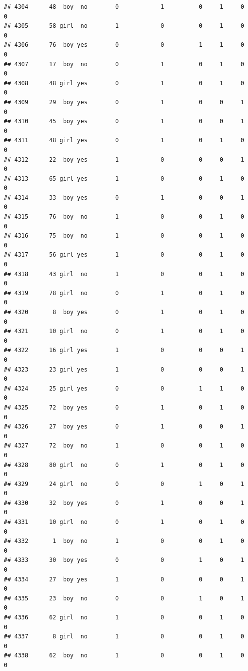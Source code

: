 \documentclass[man]{apa6}
\begin{document}
\begin{verbatim}
## 4304      48  boy  no        0            1          0     1     0     0
## 4305      58 girl  no        1            0          0     1     0     0
## 4306      76  boy yes        0            0          1     1     0     0
## 4307      17  boy  no        0            1          0     1     0     0
## 4308      48 girl yes        0            1          0     1     0     0
## 4309      29  boy yes        0            1          0     0     1     0
## 4310      45  boy yes        0            1          0     0     1     0
## 4311      48 girl yes        0            1          0     1     0     0
## 4312      22  boy yes        1            0          0     0     1     0
## 4313      65 girl yes        1            0          0     1     0     0
## 4314      33  boy yes        0            1          0     0     1     0
## 4315      76  boy  no        1            0          0     1     0     0
## 4316      75  boy  no        1            0          0     1     0     0
## 4317      56 girl yes        1            0          0     1     0     0
## 4318      43 girl  no        1            0          0     1     0     0
## 4319      78 girl  no        0            1          0     1     0     0
## 4320       8  boy yes        0            1          0     1     0     0
## 4321      10 girl  no        0            1          0     1     0     0
## 4322      16 girl yes        1            0          0     0     1     0
## 4323      23 girl yes        1            0          0     0     1     0
## 4324      25 girl yes        0            0          1     1     0     0
## 4325      72  boy yes        0            1          0     1     0     0
## 4326      27  boy yes        0            1          0     0     1     0
## 4327      72  boy  no        1            0          0     1     0     0
## 4328      80 girl  no        0            1          0     1     0     0
## 4329      24 girl  no        0            0          1     0     1     0
## 4330      32  boy yes        0            1          0     0     1     0
## 4331      10 girl  no        0            1          0     1     0     0
## 4332       1  boy  no        1            0          0     1     0     0
## 4333      30  boy yes        0            0          1     0     1     0
## 4334      27  boy yes        1            0          0     0     1     0
## 4335      23  boy  no        0            0          1     0     1     0
## 4336      62 girl  no        1            0          0     1     0     0
## 4337       8 girl  no        1            0          0     1     0     0
## 4338      62  boy  no        1            0          0     1     0     0

\end{verbatim}
\end{document}
